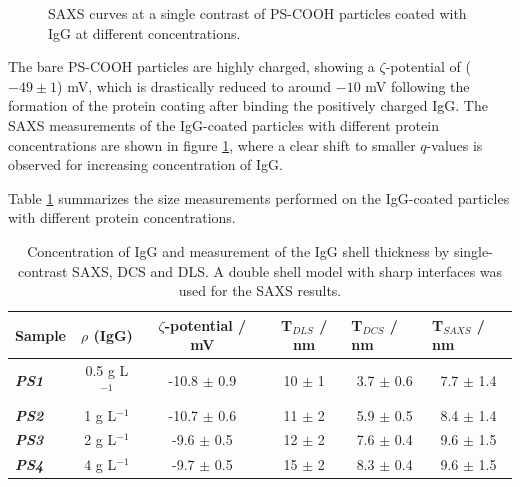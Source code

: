 \begin{figure}
	\centering
		
		\caption{SAXS curves at a single contrast of PS-COOH particles coated with IgG at different concentrations.}
		\label{fig:CoatedKiskerIgGSingleContrastSAXS}
\end{figure}

The bare PS-COOH particles are highly charged, showing a $\zeta$-potential of ($-49 \pm 1$) mV, which is drastically reduced to around $ -10$ mV following the formation of the protein coating after binding the positively charged IgG. The SAXS measurements of the IgG-coated particles with different protein concentrations are shown in figure \ref{fig:CoatedKiskerIgGSingleContrastSAXS}, where a clear shift to smaller $q$-values is observed for increasing concentration of IgG. 




Table \ref{tab:CoatedKiskerSingleContrast} summarizes the size measurements performed on the IgG-coated particles with different protein concentrations. 



\begin{table}[]
\centering
\caption{Concentration of IgG and measurement of the IgG shell thickness by single-contrast SAXS, DCS and DLS. A double shell model with sharp interfaces was used for the SAXS results.}
\label{tab:CoatedKiskerSingleContrast}
\begin{tabular}{|l|c|c|c|c|c|}
\hline
\multicolumn{1}{|c|}{\textbf{Sample}} & \textbf{$\rho$ (IgG) } & \textbf{$\zeta$-potential / mV} & \textbf{T$_{DLS}$ / nm} & \multicolumn{1}{l|}{\textbf{T$_{DCS}$ / nm}} & \multicolumn{1}{l|}{\textbf{T$_{SAXS}$ / nm}} \\ \hline
\textit{\textbf{PS1}}                 & 0.5 g L$^{-1}$                      & -10.8 $\pm$ 0.9                  & 10 $\pm$ 1              & 3.7 $\pm$ 0.6                                & 7.7 $\pm$ 1.4                                 \\ \hline
\textit{\textbf{PS2}}                 & 1 g L$^{-1}$                        & -10.7 $\pm$ 0.6                  & 11 $\pm$ 2              & 5.9 $\pm$ 0.5                                & 8.4 $\pm$ 1.4                                 \\ \hline
\textit{\textbf{PS3}}                 & 2 g L$^{-1}$                        & -9.6 $\pm$ 0.5                   & 12 $\pm$ 2              & 7.6 $\pm$ 0.4                                & 9.6 $\pm$ 1.5                                 \\ \hline
\textit{\textbf{PS4}}                 & 4 g L$^{-1}$                        & -9.7 $\pm$ 0.5                   & 15 $\pm$ 2              & 8.3 $\pm$ 0.4                                & 9.6 $\pm$ 1.5                                 \\ \hline
\end{tabular}
\end{table}



